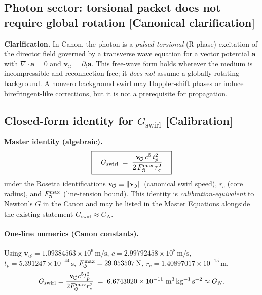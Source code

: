\documentclass[10pt,reprint,aps,onecolumn,nofootinbib]{revtex4-2}
\newcommand{\vswirl}{\mathbf{v}_{\!\boldsymbol{\circlearrowleft}}}
\newcommand{\Fmaxswirl}{F^{\max}_{\mkern-1mu\scriptscriptstyle\boldsymbol{\circlearrowleft}}}
\newcommand{\Fmax}{\Fmaxswirl} %
\newcommand{\vnorm}{\lVert \mathbf{v}_{\mkern-2mu\scriptscriptstyle\boldsymbol{\circlearrowleft}} \rVert}               %
\newcommand{\Ce}{\vswirl}                                %
\newcommand{\rc}{r_c}                                    %
\newcommand{\statusCalibration}{\textsf{[Calibration]}}
\newcommand{\statusCanonical}{\textsf{[Canonical clarification]}}
\providecommand{\rc}{r_c}
\begin{document}
    \subsection{Photon sector: torsional packet does not require global rotation \statusCanonical}
    \textbf{Clarification.}
    In Canon, the photon is a \emph{pulsed torsional} (R-phase) excitation of the director field governed by a transverse wave equation for a vector potential \(\mathbf a\) with \(\nabla\!\cdot\!\mathbf a=0\) and \(\vswirl=\partial_t\mathbf a\). This free-wave form holds wherever the medium is incompressible and reconnection-free; it \emph{does not} assume a globally rotating background. A nonzero background swirl may Doppler-shift phases or induce birefringent-like corrections, but it is not a prerequisite for propagation.

    \subsection{Closed-form identity for \(G_{\text{swirl}}\) \statusCalibration}
    \textbf{Master identity (algebraic).}
    \[
        \boxed{\quad
        G_{\text{swirl}}
            \;=\;
            \frac{\Ce\,c^{5}\,t_p^{2}}{2\,\Fmax\,\rc^{2}}
            \quad}
    \]
    under the Rosetta identifications \(\Ce\equiv \vnorm\) (canonical swirl speed), \(\rc\) (core radius), and \(\Fmax\) (line-tension bound). This identity is \emph{calibration-equivalent} to Newton’s \(G\) in the Canon and may be listed in the Master Equations alongside the existing statement \(G_{\text{swirl}}\approx G_N\).

    \paragraph{One-line numerics (Canon constants).}
        Using
        \(\Ce=1.09384563\times10^{6}\,\mathrm{m/s}\),
        \(c=2.99792458\times10^{8}\,\mathrm{m/s}\),
        \(t_p=5.391247\times10^{-44}\,\mathrm{s}\),
        \(\Fmax=29.053507\,\mathrm{N}\),
        \(\rc=1.40897017\times10^{-15}\,\mathrm{m}\),
        \[
            G_{\text{swirl}}
            =\frac{\Ce c^5 t_p^2}{2\Fmax \rc^2}
            \;=\;6.6743020\times10^{-11}\ \mathrm{m^3\,kg^{-1}\,s^{-2}}
            \approx G_N.
        \]

\end{document}
